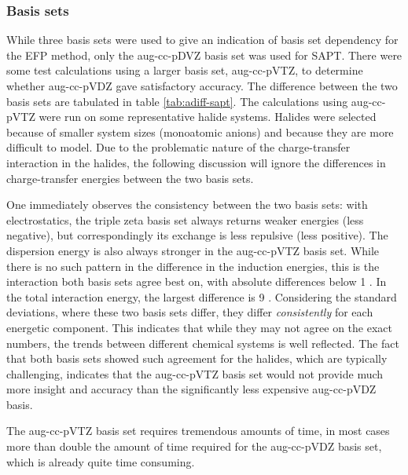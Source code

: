 \begin{multicols}{2}
\subsubsection{Basis sets}
While three basis sets were used to give an indication of basis set dependency for the EFP method, only the aug-cc-pDVZ basis set was used for SAPT. 
There were some test calculations using a larger basis set, aug-cc-pVTZ, to determine whether aug-cc-pVDZ gave satisfactory accuracy.
The difference between the two basis sets are tabulated in 
table \ref{tab:adiff-sapt}.
The calculations using aug-cc-pVTZ were run on some representative halide systems. 
Halides were selected because of smaller system sizes (monoatomic anions) and because they are more difficult to model. 
Due to the problematic nature of the charge-transfer interaction in the halides, the following discussion will ignore the differences in charge-transfer energies between the two basis sets.


One immediately observes the consistency between the two basis sets: with electrostatics, the triple zeta basis set always returns weaker energies (less negative), but correspondingly its exchange is less repulsive (less positive).
The dispersion energy is also always stronger in the aug-cc-pVTZ basis set. 
While there is no such pattern in the difference in the induction energies, this is the interaction both basis sets agree best on, with absolute differences below 1 \enUnit.
In the total interaction energy, the largest difference is 9 \enUnit. 
Considering the standard deviations, where these two basis sets differ, they differ \emph{consistently} for each energetic component. 
This indicates that while they may not agree on the exact numbers, the trends between different chemical systems is well reflected.
The fact that both basis sets showed such agreement for the halides, which are typically challenging, indicates that the aug-cc-pVTZ basis set would not provide much more insight and accuracy than the significantly less expensive aug-cc-pVDZ basis.


The aug-cc-pVTZ basis set requires tremendous amounts of time, in most cases more than double the amount of time required for the aug-cc-pVDZ basis set, which is already quite time consuming.


\end{multicols}


